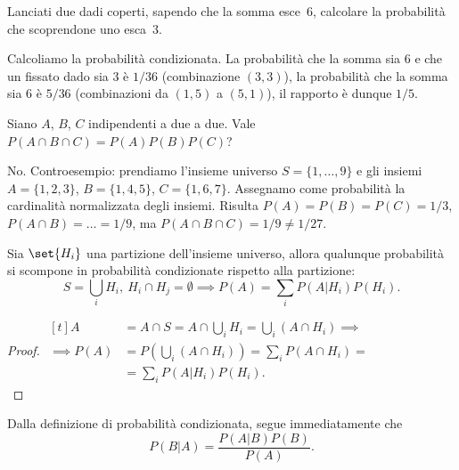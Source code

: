 
\begin{exercise}
	\label{teo:sommadadi}
	Lanciati due dadi coperti, sapendo che la somma esce~6, calcolare la probabilità che scoprendone uno esca~3.
\end{exercise}

\begin{solution}
	Calcoliamo la probabilità condizionata. La probabilità che la somma sia 6 e che un fissato dado sia 3 è $1/36$ (combinazione $(3,3)$), la probabilità che la somma sia 6 è $5/36$ (combinazioni da $(1,5)$ a $(5,1)$), il rapporto è dunque $1/5$.
\end{solution}

\begin{exercise}
	Siano $A$, $B$, $C$ indipendenti a due a due. Vale $P(A\cap B\cap C)=P(A)P(B)P(C)$?
\end{exercise}

\begin{solution}
	No. Controesempio: prendiamo l'insieme universo
	$S = \{1,\dots,9\}$
	e gli insiemi
	$A = \{1, 2, 3\}$,
	$B = \{1, 4, 5\}$,
	$C = \{1, 6, 7\}$.
	Assegnamo come probabilità la cardinalità normalizzata degli insiemi.
	Risulta $P(A)=P(B)=P(C)=1/3$, $P(A\cap B)=\dots=1/9$, ma $P(A\cap B\cap C)=1/9\neq1/27$.
\end{solution}

\begin{theorem}
	Sia $\set{H_i}$ una partizione dell'insieme universo,
	allora qualunque probabilità si scompone in probabilità condizionate rispetto alla partizione:
	\begin{equation*}
		S=\bigcup_iH_i,\ H_i\cap H_j=\emptyset\implies P(A)=\sum_iP(A|H_i)P(H_i).
	\end{equation*}
\end{theorem}

\begin{proof}
	$\begin{aligned}[t]
		A &= A\cap S = A\cap \bigcup_iH_i = \bigcup_i(A\cap H_i) \implies \\
		\implies P(A) &= P\left(\bigcup_i(A\cap H_i)\right) = \sum_i P(A\cap H_i) = \\
		&= \sum_i P(A|H_i)P(H_i).
	\end{aligned}$\vspace{-1em}\\
\end{proof}


\begin{theorem}[di Bayes]
	Dalla definizione di probabilità condizionata, segue immediatamente che
	\begin{equation*}
		P(B|A) = \frac{P(A|B) P(B)}{P(A)}.
	\end{equation*}
\end{theorem}
